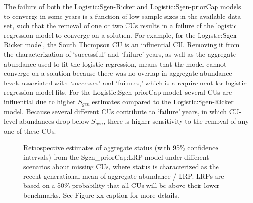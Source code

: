 \documentclass[11pt]{book}
\begin{document}
The failure of both the Logistic:Sgen-Ricker and Logistic:Sgen-priorCap models to converge in some years is a function of low sample sizes in the available data set, such that the removal of one or two CUs results in a failure of the logistic regression model to converge on a solution. For example, for the Logistic:Sgen-Ricker model, the South Thompson CU is an influential CU. Removing it from the characterization of `successful' and `failure' years, as well as the aggregate abundance used to fit the logistic regression, means that the model cannot converge on a solution because there was no overlap in aggregate abundance levels associated with `successes' and `failures,' which is a requirement for logistic regression model fits. For the Logistic:Sgen-priorCap model, several CUs are influential due to higher \(S_{gen}\) estimates compared to the Logistic:Sgen-Ricker model. Because several different CUs contribute to `failure' years, in which CU-level abundances drop below \(S_{gen}\), there is higher sensitivity to the removal of any one of these CUs.
\begin{figure}[htb]

{\centering {} 

}

\caption{Retrospective estimates of aggregate status (with 95\% confidence intervals) from the Sgen\_priorCap:LRP model under different scenarios about missing CUs, where status is characterized as the recent generational mean of aggregate abundance / LRP. LRPs are based on a 50\% probability that all CUs will be above their lower benchmarks. See Figure xx caption for more details.}\label{fig:coho-IMCap-missingCUs}
\end{figure}
\linebreak
\end{document}
